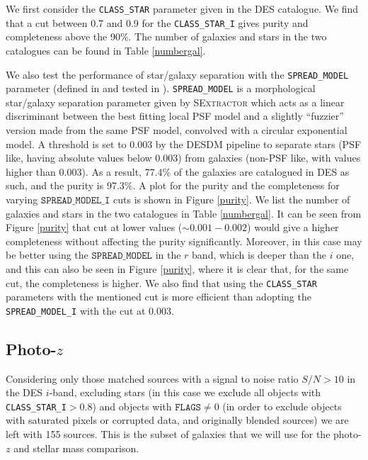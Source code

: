 {We first consider the \texttt{CLASS\_STAR} parameter given in the DES catalogue. We find that a cut between 0.7 and 0.9 for the \texttt{CLASS\_STAR\_I} gives purity and completeness above the 90\%. The number of galaxies and stars in the two catalogues can be found in Table \ref{numbergal}.

We also test the performance of star/galaxy separation with the \texttt{SPREAD\_MODEL} parameter (defined in \citealt{desai} and tested in \citealt{spreadmodel}). \texttt{SPREAD\_MODEL}  is a morphological star/galaxy separation parameter given by \textsc{SExtractor} which acts as a linear discriminant between the best fitting local PSF model and a slightly ``fuzzier'' version made from the same PSF model, convolved with a circular exponential model. A threshold is set to 0.003 by the DESDM pipeline to separate stars (PSF like, having absolute values below 0.003) from galaxies (non-PSF like, with values higher than 0.003). As a result, 77.4\% of the galaxies are catalogued in DES as such, and the purity is 97.3\%. 
 A plot for the purity and the completeness for varying  $\texttt{SPREAD\_MODEL\_I}$ cuts is shown in Figure \ref{purity}. We list the number of galaxies and stars in the two catalogues in Table \ref{numbergal}. It can be seen from Figure \ref{purity} that cut at lower values ($\sim 0.001-0.002$) would give a higher completeness without affecting the purity significantly. Moreover, in this case may be better using the $\texttt{SPREAD\_MODEL}$ in the $r$ band, which is deeper than the $i$ one, and this can also be seen in Figure \ref{purity}, where it is clear that, for the same cut, the completeness is higher. We also find that using the \texttt{CLASS\_STAR} parameters with the mentioned cut is more efficient than adopting the \texttt{SPREAD\_MODEL\_I} with the cut at 0.003.

\subsection{Photo-$z$}\label{sec:z}
Considering only those matched sources with a signal to noise ratio $S/N>10$ in the DES $i$-band, excluding stars (in this case we exclude all objects with \texttt{CLASS\_STAR\_I}$>0.8$) and objects with $\texttt{FLAGS}\neq 0$ (in order to exclude objects with saturated pixels or corrupted data, and originally blended sources) we are left with 155 sources. This is the subset of galaxies that we will use for the photo-$z$ and stellar mass comparison.

}
